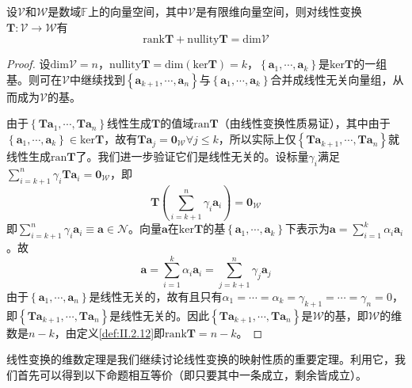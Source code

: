 \documentclass[main.tex]{subfiles}
\begin{document}
\begin{theorem}[线性变换的维数定理]\label{thm:II.2.8}
    设$\mathcal{V}$和$\mathcal{W}$是数域$\mathbb{F}$上的向量空间，其中$\mathcal{V}$是有限维向量空间，则对线性变换$\mathbf{T}:\mathcal{V}\rightarrow\mathcal{W}$有
    \[
        \mathrm{rank}\mathbf{T}+\mathrm{nullity}\mathbf{T}=\mathrm{dim}\mathcal{V}
    \]
\end{theorem}
\begin{proof}
    设$\mathrm{dim}\mathcal{V}=n$，$\mathrm{nullity}\mathbf{T}=\mathrm{dim}\left(\mathrm{ker}\mathbf{T}\right)=k$，$\left\{\mathbf{a}_1,\cdots,\mathbf{a}_k\right\}$是$\mathrm{ker}\mathbf{T}$的一组基。则可在$\mathcal{V}$中继续找到$\left\{\mathbf{a}_{k+1},\cdots,\mathbf{a}_{n}\right\}$与$\left\{\mathbf{a}_1,\cdots,\mathbf{a}_k\right\}$合并成线性无关向量组，从而成为$\mathcal{V}$的基。

    由于$\left\{\mathbf{Ta}_1,\cdots,\mathbf{Ta}_n\right\}$线性生成$\mathbf{T}$的值域$\mathrm{ran}\mathbf{T}$（由线性变换性质易证），其中由于$\left\{\mathbf{a}_1,\cdots,\mathbf{a}_k\right\}\in\mathrm{ker}\mathbf{T}$，故有$\mathbf{Ta}_j=\mathbf{0}_\mathcal{W}\forall j\leq k$，所以实际上仅$\left\{\mathbf{Ta}_{k+1},\cdots,\mathbf{Ta}_n\right\}$就线性生成$\mathrm{ran}\mathbf{T}$了。我们进一步验证它们是线性无关的。设标量$\gamma_i$满足$\sum_{i=k+1}^n\gamma_i\mathbf{Ta}_i=\mathbf{0}_\mathcal{W}$，即
    \[\mathbf{T}\left(\sum_{i=k+1}^n\gamma_i\mathbf{a}_i\right)=\mathbf{0}_\mathcal{W}\]
    即$\sum_{i=k+1}^n\gamma_i\mathbf{a}_i\equiv\mathbf{a}\in\mathcal{N}$。向量$\mathbf{a}$在$\mathrm{ker}\mathbf{T}$的基$\left\{\mathbf{a}_1,\cdots,\mathbf{a}_k\right\}$下表示为$\mathbf{a}=\sum_{i=1}^k\alpha_i\mathbf{a}_i$。故
    \[
        \mathbf{a}=\sum_{i=1}^k\alpha_i\mathbf{a}_i=\sum_{j=k+1}^n\gamma_j\mathbf{a}_j
    \]
    由于$\left\{\mathbf{a}_1,\cdots,\mathbf{a}_n\right\}$是线性无关的，故有且只有$\alpha_1=\cdots=\alpha_k=\gamma_{k+1}=\cdots=\gamma_n=0$，即$\left\{\mathbf{Ta}_{k+1},\cdots,\mathbf{Ta}_n\right\}$是线性无关的。因此$\left\{\mathbf{Ta}_{k+1},\cdots,\mathbf{Ta}_n\right\}$是$\mathcal{W}$的基，即$\mathcal{W}$的维数是$n-k$，由定义\ref{def:II.2.12}即$\mathrm{rank}\mathbf{T}=n-k$。
\end{proof}

线性变换的维数定理是我们继续讨论线性变换的映射性质的重要定理。利用它，我们首先可以得到以下命题相互等价（即只要其中一条成立，剩余皆成立）。
\end{document}

